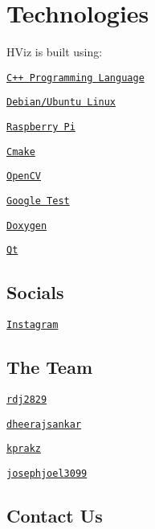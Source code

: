 \section*{Technologies}

H\+Viz is built using\+:


\begin{DoxyItemize}
\item \href{https://www.cplusplus.com/}{\tt C++ Programming Language}
\item \href{https://www.linux.org/}{\tt Debian/\+Ubuntu Linux}
\item \href{https://www.raspberrypi.org}{\tt Raspberry Pi}
\item \href{https://cmake.org/}{\tt Cmake}
\item \href{https://opencv.org/}{\tt Open\+CV}
\item \href{https://github.com/google/googletest}{\tt Google Test}
\item \href{https://www.doxygen.nl/index.html}{\tt Doxygen}
\item \href{https://www.qt.io/}{\tt Qt}
\end{DoxyItemize}

\subsection*{Socials}


\begin{DoxyItemize}
\item \href{https://www.instagram.com/hapticvision_/}{\tt Instagram}
\end{DoxyItemize}

\subsection*{The Team}


\begin{DoxyItemize}
\item \href{https://github.com/rdj2829}{\tt rdj2829}
\item \href{https://github.com/dheerajsankar}{\tt dheerajsankar}
\item \href{https://github.com/kprakz}{\tt kprakz}
\item \href{https://github.com/josephjoel3099}{\tt josephjoel3099}
\end{DoxyItemize}

\subsection*{Contact Us}



